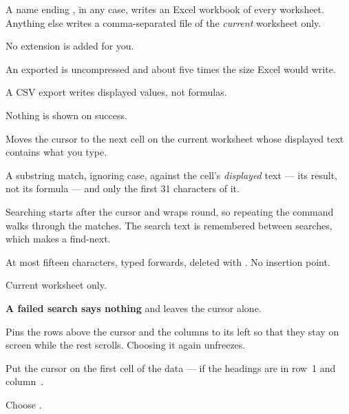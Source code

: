 \begin{ccsteps}
\item A name ending , in any case, writes an Excel workbook of
every worksheet. Anything else writes a comma-separated file of the
\emph{current} worksheet only.
\item No extension is added for you.
\item An exported  is uncompressed and about five times the size
Excel would write.
\item A CSV export writes displayed values, not formulas.
\item Nothing is shown on success.
\end{ccsteps}


Moves the cursor to the next cell on the current worksheet whose displayed text
contains what you type.

\begin{ccsteps}
\item A substring match, ignoring case, against the cell's \emph{displayed}
text --- its result, not its formula --- and only the first 31 characters of it.
\item Searching starts after the cursor and wraps round, so repeating the
command walks through the matches. The search text is remembered between
searches, which makes   a find-next.
\item At most fifteen characters, typed forwards, deleted with
. No insertion point.
\item Current worksheet only.
\item \textbf{A failed search says nothing} and leaves the cursor alone.
\end{ccsteps}


Pins the rows above the cursor and the columns to its left so that they stay on
screen while the rest scrolls. Choosing it again unfreezes.

\begin{ccprocedure}[]
\item Put the cursor on the first cell of the data ---  if the
headings are in row~1 and column~.
\item Choose .
\end{ccprocedure}

